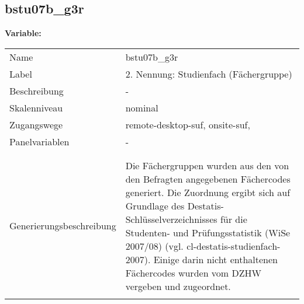 	
	
	\subsection{bstu07b\_g3r}
	\label{subSection:bstu07b_g3r}

	\noindent\textbf{Variable:}\\
		\begin{tabular}{lL{11.3cm}}
			\label{tableVariable:bstu07b_g3r}
			Name & bstu07b\_g3r \\
			Label & 2. Nennung: Studienfach (Fächergruppe) \\
			Beschreibung & - \\
			Skalenniveau & nominal \\
			Zugangswege &
				remote-desktop-suf,
				onsite-suf,
 \\
			Panelvariablen & -
			 \\
			 \\
 \\
					Generierungsbeschreibung & Die Fächergruppen wurden aus den von den Befragten angegebenen Fächercodes generiert. Die Zuordnung ergibt sich auf Grundlage des Destatis-Schlüsselverzeichnisses für die Studenten- und Prüfungsstatistik (WiSe 2007/08) (vgl. cl-destatis-studienfach-2007).  Einige darin nicht enthaltenen Fächercodes wurden vom DZHW vergeben und zugeordnet. 
				 \\	
			 \\
		\end{tabular}







